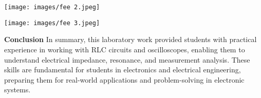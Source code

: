 \documentclass{article}
\begin{document}

\begin{flushleft}
    \centering
    \texttt{[image: images/fee 2.jpeg]}
\end{flushleft}

\begin{flushleft}
    \centering
    \texttt{[image: images/fee 3.jpeg]}
\end{flushleft}



\begin{flushleft}
\noindent \textbf{Conclusion}
In summary, this laboratory work provided students with practical experience in working with RLC circuits and oscilloscopes, enabling them to understand electrical impedance, resonance, and measurement analysis. These skills are fundamental for students in electronics and electrical engineering, preparing them for real-world applications and problem-solving in electronic systems.
\end{flushleft}
\end{document}
